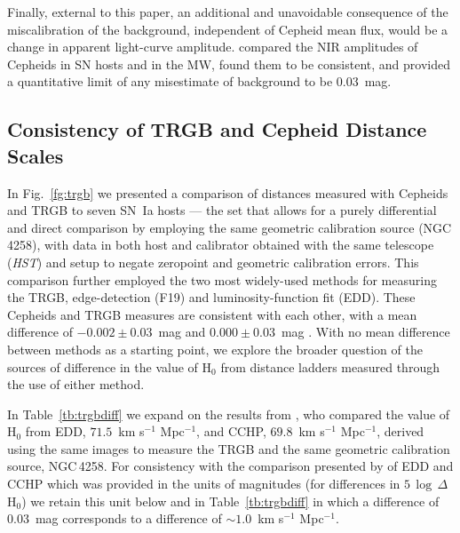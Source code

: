 \documentclass[12pt]{aastex631}
\newcommand{\kms}{km s$^{-1}$ Mpc$^{-1}$}
\begin{document}
Finally, external to this paper, an additional and unavoidable consequence of the miscalibration of the background, independent of Cepheid mean flux, would be a change in apparent light-curve amplitude.  \citet{Riess:2020} compared the NIR amplitudes of Cepheids in SN hosts and in the MW, found them to be consistent, and provided a quantitative limit of any misestimate of background to be 0.03~mag.  

\subsection{Consistency of TRGB and Cepheid Distance Scales\label{sc:7.2}}
    
In Fig.~\ref{fg:trgb} we presented a comparison of distances measured with Cepheids and TRGB to seven SN~Ia hosts --- the set that allows for a purely differential and direct comparison by employing the same geometric calibration source (NGC$\,$4258), with data in both host and calibrator obtained with the same  telescope ({\it HST}) and setup to negate zeropoint and geometric calibration errors. This comparison further employed the two most widely-used methods for measuring the TRGB, edge-detection (F19) and luminosity-function fit (EDD).  These Cepheids and TRGB measures are consistent with each other, with a mean difference of $-0.002\pm0.03$~mag \citep[CCHP;][]{Freedman:2021} and $0.000\pm0.03$~mag \citep[EDD;][]{Anand:2021}.  With no mean difference between methods as a starting point, we explore the broader question of the sources of difference in the value of H$_0$ from distance ladders measured through the use of either method.

In Table~\ref{tb:trgbdiff} we expand on the results from \citet{Anand:2021}, who compared the value of H$_0$ from EDD, $71.5$~\kms, and CCHP, $69.8$~\kms, derived using the same images to measure the TRGB and the same geometric calibration source, NGC$\,$4258. 
For consistency with the comparison presented by \citet{Anand:2021} of EDD and CCHP which was provided in the units of magnitudes (for differences in $5\,\log\,\Delta$H$_0$) we retain this unit below and in Table~\ref{tb:trgbdiff} in which a difference of 0.03~mag corresponds to a difference of $\sim 1.0$~\kms. 
\end{document}
